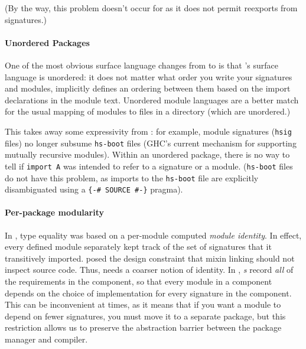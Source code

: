 (By the way, this problem doesn't occur for \OldBackpack{} as it does
not permit reexports from signatures.)


\paragraph{Unordered Packages}

One of the most obvious surface language changes from \OldBackpack{}
to \Backpack{} is that \Backpack{}'s surface language is unordered: it
does not matter what order you write your signatures and modules, \Backpack{}
implicitly defines an ordering between them based on the import declarations
in the module text.  Unordered module languages are a better match for
the usual mapping of modules to files in a directory (which are unordered.)

This takes away some expressivity from \Backpack{}: for example, module
signatures (\verb|hsig| files) no longer subsume \verb|hs-boot| files
(GHC's current mechanism for supporting mutually recursive modules).
Within an unordered package, there is no way to tell if \verb|import A|
was intended to refer to a signature or a module.  (\verb|hs-boot| files
do not have this problem, as imports to the \verb|hs-boot| file are
explicitly disambiguated using a \verb|{-# SOURCE #-}| pragma).


\paragraph{Per-package modularity}

In \OldBackpack{}, type equality was based on a per-module computed
\emph{module identity}.  In effect, every defined module separately kept
track of the set of signatures that it transitively imported.
\Backpack{} posed the design constraint that mixin linking should not
inspect source code. Thus, \Backpack{} needs a coarser notion of
identity. In \Backpack{}, \emph{\uid{}s} record \emph{all} of the
requirements in the component, so that every module in a component
depends on the choice of implementation for every signature in the
component.  This can be inconvenient at times, as it means that if you
want a module to depend on fewer signatures, you must move it to a
separate package, but this restriction allows us to preserve the
abstraction barrier between the package manager and compiler.

